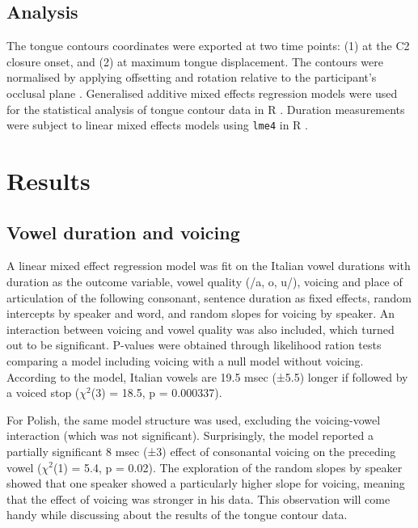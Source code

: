 \documentclass[authoryear, twocolumn]{elsarticle}
\begin{document}
\subsection{Analysis}\label{analysis}

The tongue contours coordinates were exported at two time points: (1) at
the C2 closure onset, and (2) at maximum tongue displacement. The
contours were normalised by applying offsetting and rotation relative to
the participant's occlusal plane \citep{scobbie2011}. Generalised
additive mixed effects regression models \citep{wood2006} were used for
the statistical analysis of tongue contour data in R
\citep{r-core-team2017}. Duration measurements were subject to linear
mixed effects models using \texttt{lme4} in R \citep{bates2015}.

\section{Results}\label{results}

\subsection{Vowel duration and
voicing}\label{vowel-duration-and-voicing}

A linear mixed effect regression model was fit on the Italian vowel
durations with duration as the outcome variable, vowel quality (/a, o,
u/), voicing and place of articulation of the following consonant,
sentence duration as fixed effects, random intercepts by speaker and
word, and random slopes for voicing by speaker. An interaction between
voicing and vowel quality was also included, which turned out to be
significant. P-values were obtained through likelihood ration tests
comparing a model including voicing with a null model without voicing.
According to the model, Italian vowels are 19.5 msec (±5.5) longer if
followed by a voiced stop (\(\chi^2\)(3) = 18.5, p = 0.000337).

For Polish, the same model structure was used, excluding the
voicing-vowel interaction (which was not significant). Surprisingly, the
model reported a partially significant 8 msec (±3) effect of consonantal
voicing on the preceding vowel (\(\chi^2\)(1) = 5.4, p = 0.02). The
exploration of the random slopes by speaker showed that one speaker
showed a particularly higher slope for voicing, meaning that the effect
of voicing was stronger in his data. This observation will come handy
while discussing about the results of the tongue contour data.
\end{document}
